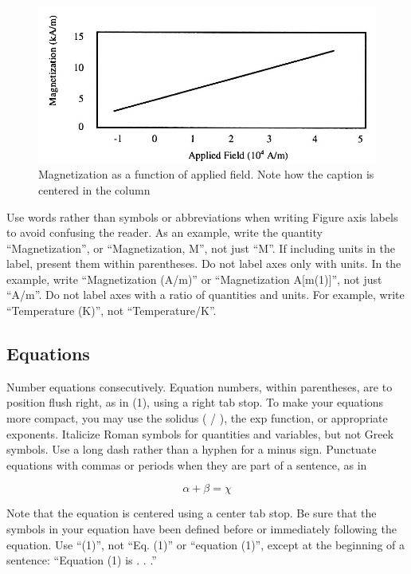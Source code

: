 \documentclass{MIPRO}
\begin{document}
\begin{figure}
  \label{fig:figure1}
  \centering
  \includegraphics{figure1.jpg}
  \caption{Magnetization as a function of applied field. Note how the caption is centered in the column}
\end{figure}

Use words rather than symbols or abbreviations when writing Figure axis labels to avoid confusing the reader. As an example, write the quantity “Magnetization”, or “Magnetization, M”, not just “M”. If including units in the label, present them within parentheses. Do not label axes only with units. In the example, write “Magnetization (A/m)” or “Magnetization {A[m(1)]}”, not just “A/m”. Do not label axes with a ratio of quantities and units. For example, write “Temperature (K)”, not “Temperature/K”.

\subsection{Equations}

Number equations consecutively. Equation numbers, within parentheses, are to position flush right, as in (1), using a right tab stop. To make your equations more compact, you may use the solidus ( / ), the exp function, or appropriate exponents. Italicize Roman symbols for quantities and variables, but not Greek symbols. Use a long dash rather than a hyphen for a minus sign. Punctuate equations with commas or periods when they are part of a sentence, as in

\begin{equation}
    \alpha + \beta = \chi
\end{equation}

Note that the equation is centered using a center tab stop. Be sure that the symbols in your equation have been defined before or immediately following the equation. Use “(1)”, not “Eq. (1)” or “equation (1)”, except at the beginning of a sentence: “Equation (1) is . . .”
\end{document}
